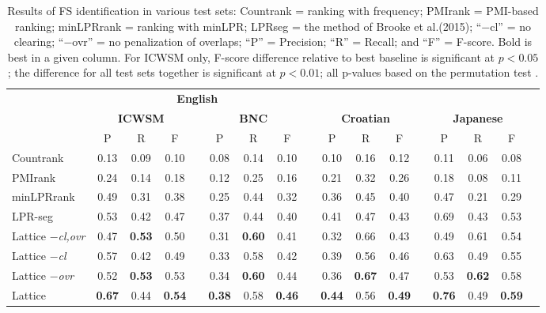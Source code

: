 \documentclass[11pt,letterpaper]{article}
\makeatletter
\def \al {al.\@ }
\makeatother
\begin{document}
 \begin{table}[!bt]
 
 \begin{center}
	 \setlength{\tabcolsep}{5.5pt}
\begin{tabular}{lcccccccccccccccc}

       \toprule
				& \multicolumn{7}{c}{\bf{English}} \\
       \cmidrule(lr){2-8}			
       & \multicolumn{3}{c}{\bf{ICWSM}} & &  \multicolumn{3}{c}{\bf{BNC}} & & \multicolumn{3}{c}{\bf{Croatian}}  && \multicolumn{3}{c}{\bf{Japanese}} \\
       \cmidrule(lr){2-4} \cmidrule(lr){6-8} \cmidrule(lr){10-12} \cmidrule(lr){14-16}
      & P & R & F &   & P & R & F &   & P & R & F &  & P & R & F \\
          \midrule 
Countrank & 0.13& 0.09 & 0.10 && 0.08 & 0.14 & 0.10 && 0.10 & 0.16 & 0.12 && 0.11 & 0.06 & 0.08 \\
PMIrank & 0.24& 0.14& 0.18 & & 0.12 & 0.25 & 0.16 & & 0.21 &0.32 & 0.26 & & 0.18& 0.08 & 0.11 \\ 
minLPRrank & 0.49& 0.31 & 0.38 & & 0.25& 0.44 & 0.32 & & 0.36 & 0.45 & 0.40 &  & 0.47 & 0.21 & 0.29 \\ 

LPR-seg  &0.53 & 0.42 & 0.47 && 0.37 & 0.44 & 0.40 & & 0.41 & 0.47  & 0.43 &  & 0.69 & 0.43 & 0.53 \\ 
  \midrule

	Lattice \emph{$-$cl,ovr} & 0.47& \bf{0.53} & 0.50 & & 0.31& \bf{0.60} & 0.41 & & 0.32 & 0.66 & 0.43 & & 0.49 & 0.61 & 0.54 \\ 

	Lattice \emph{$-$cl} & 0.57& 0.42 & 0.49 & & 0.33& 0.58 & 0.42 & & 0.39 & 0.56 & 0.46 & & 0.63 & 0.49 & 0.55 \\  	 
			
	Lattice \emph{$-$ovr} & 0.52& \bf{0.53} & 0.53 & & 0.34& \bf{0.60} & 0.44& & 0.36 & \bf{0.67} & 0.47 & & 0.53 & \bf{0.62} & 0.58 \\  
			
				Lattice & \bf{0.67} & 0.44 & \bf{0.54} & & \bf{0.38}& 0.58 & \bf{0.46} & &\bf{0.44} & 0.56 & \bf{0.49} & & \bf{0.76} & 0.49 & \bf{0.59} \\ 
            \bottomrule

 \end{tabular}
 \caption{Results of FS identification in various test sets: Countrank = ranking with frequency; PMIrank = PMI-based ranking; minLPRrank = ranking with minLPR; LPRseg = the method of Brooke et \al (2015); ``$-$cl'' = no clearing; ``$-$ovr'' = no penalization of overlaps; ``P'' = Precision; ``R'' = Recall; and ``F'' = F-score. Bold is best in a given column. For ICWSM only, F-score difference relative to best baseline is significant at $p < 0.05$; the difference for all test sets together is significant at $ p < 0.01$; all p-values based on the permutation test \protect\cite{yeh2000more}.}
	 \label{tab:main}

 \end{center}


 \end{table}
\end{document}
